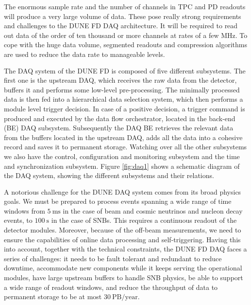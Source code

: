 The enormous sample rate and the number of channels in TPC and PD readouts will produce a very large volume of data. These pose really strong requirements and challenges to the DUNE FD DAQ architecture. It will be required to read out data of the order of ten thousand or more channels at rates of a few MHz. To cope with the huge data volume, segmented readouts and compression algorithms are used to reduce the data rate to manageable levels.

The DAQ system of the DUNE FD is composed of five different subsystems. The first one is the upstream DAQ, which receives the raw data from the detector, buffers it and performs some low-level pre-processing. The minimally processed data is then fed into a hierarchical data selection system, which then performs a module level trigger decision. In case of a positive decision, a trigger command is produced and executed by the data flow orchestrator, located in the back-end (BE) DAQ subsystem. Subsequently the DAQ BE retrieves the relevant data from the buffers located in the upstream DAQ, adds all the data into a cohesive record and saves it to permanent storage. Watching over all the other subsystems we also have the control, configuration and monitoring subsystem and the time and synchronization subsystem. Figure \ref{fig:daq1} shows a schematic diagram of the DAQ system, showing the different subsystems and their relations.

A notorious challenge for the DUNE DAQ system comes from its broad physics goals. We must be prepared to process events spanning a wide range of time windows from $5 \ \mathrm{ms}$ in the case of beam and cosmic neutrinos and nucleon decay events, to $100 \ \mathrm{s}$ in the case of SNBs. This requires a continuous readout of the detector modules. Moreover, because of the off-beam measurements, we need to ensure the capabilities of online data processing and self-triggering. Having this into account, together with the technical constraints, the DUNE FD DAQ faces a series of challenges: it needs to be fault tolerant and redundant to reduce downtime, accommodate new components while it keeps serving the operational modules, have large upstream buffers to handle SNB physics, be able to support a wide range of readout windows, and reduce the throughput of data to permanent storage to be at most $30 \ \mathrm{PB/year}$.